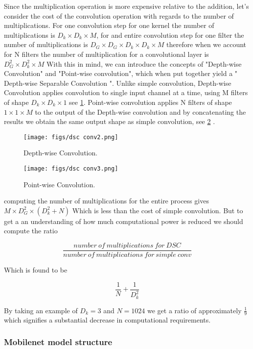 Since the multiplication operation is more expensive relative to the addition, let's consider the cost of the convolution operation with regards to the number of multiplications. For one convolution step for one kernel the number of multiplications is $D_{k} \times D_{k} \times M $, for and entire convolution step for one filter the number of multiplications is $D_{G} \times D_{G} \times D_{k} \times D_{k} \times M $ therefore when we account for N filters the number of multiplication for a convolutional layer is $D_{G}^{2} \times D_{k}^{2} \times M $
With this in mind, we can introduce the concepts of "Depth-wise Convolution" and "Point-wise convolution", which when put together yield a " Depth-wise Separable Convolution ". Unlike simple convolution, Depth-wise Convolution applies convolution to single input channel at a time, using M filters of shape  $D_{k} \times D_{k} \times 1 $ see \cref{fig:dsc_conv2}. Point-wise convolution applies N filters of shape $1 \times 1 \times M $ to the output of the Depth-wise convolution and by concatenating the results we obtain the same output shape as simple convolution, see \cref{fig:dsc_conv3} \cite{b11}.

\begin{figure}[ht]
	\centering
	\texttt{[image: figs/dsc conv2.png]}
	\caption{Depth-wise Convolution.}\label{fig:dsc_conv2}
\end{figure}

\begin{figure}[ht]
	\centering
	\texttt{[image: figs/dsc conv3.png]}
	\caption{Point-wise Convolution.}\label{fig:dsc_conv3}
\end{figure}

computing the number of multiplications for the entire process gives  $M \times D_{G}^{2} \times (D_{k}^{2}+N) $ Which is less than the cost of simple convolution. But to get a an understanding of how much computational power is reduced we should compute the ratio

$$
\frac{number\ of\ multiplications\ for\ DSC}{number\ of\ multiplications\ for\ simple\ conv}
$$

Which is found to be

$$
\frac{1}{N} + \frac{1}{D_{k}^2}
$$

By taking an example of $D_{k} = 3$ and $N = 1024$ we get a ratio of approximately $\frac{1}{9}$ which signifies a substantial decrease in computational requirements.

\subsubsection{Mobilenet model structure}

